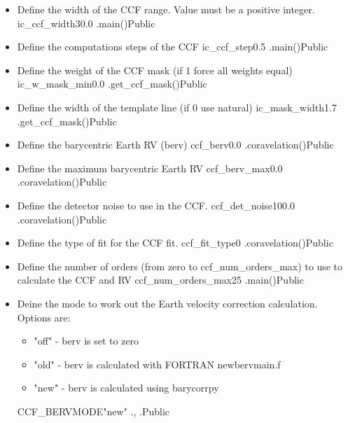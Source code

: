 \begin{itemize}

\item {}
{Define the width of the CCF range. Value must be a positive integer.}
{ic\_ccf\_width}{30.0}
{\calCCF}{\constantsfile}{\calCCF.main()}{Public}


\item {}
{Define the computations steps of the CCF }
{ic\_ccf\_step}{0.5}
{\calCCF}{\constantsfile}{\calCCF.main()}{Public}


\item {}
{Define the weight of the CCF mask (if 1 force all weights equal)}
{ic\_w\_mask\_min}{0.0}
{\calCCF}{\constantsfile}{\spirouRV.get\_ccf\_mask()}{Public}


\item {}
{Define the width of the template line (if 0 use natural)}
{ic\_mask\_width}{1.7}
{\calCCF}{\constantsfile}{\spirouRV.get\_ccf\_mask()}{Public}


\item {}
{Define the barycentric Earth RV (berv)}
{ccf\_berv}{0.0}
{\calCCF}{\constantsfile}{\spirouRV.coravelation()}{Public}


\item {}
{Define the maximum barycentric Earth RV }
{ccf\_berv\_max}{0.0}
{\calCCF}{\constantsfile}{\spirouRV.coravelation()}{Public}


\item {}
{Define the detector noise to use in the CCF.}
{ccf\_det\_noise}{100.0}
{\calCCF}{\constantsfile}{\spirouRV.coravelation()}{Public}


\item {}
{Define the type of fit for the CCF fit.}
{ccf\_fit\_type}{0}
{\calCCF}{\constantsfile}{\spirouRV.coravelation()}{Public}


\item {}
{Define the number of orders (from zero to ccf\_num\_orders\_max) to use to calculate the CCF and RV}
{ccf\_num\_orders\_max}{25}
{\calCCF}{\constantsfile}{\calCCF.main()}{Public}


\item {} 
{Deine the mode to work out the Earth velocity correction calculation. Options are:
\begin{itemize}
	\item "off" - berv is set to zero
	\item "old" - berv is calculated with FORTRAN newbervmain.f
	\item "new" - berv is calculated using barycorrpy
\end{itemize}
}
{CCF\_BERVMODE}{"new"}
{\calCCF}{\constantsfile}{\calCCF.\progMAIN, \spirouRV.}{Public}


\end{itemize}
